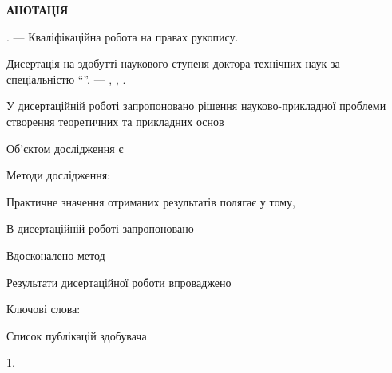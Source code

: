 \clearpage

\begin{center}
\textbf{АНОТАЦІЯ}
\end{center}

\medskip

\textit{\dissauthorUa} \booknameUa.
--- Кваліфікаційна робота на правах рукопису.

Дисертація на здобутті наукового ступеня доктора технічних наук за спеціальністю
\dissSpecId ``\dissSpecUa''. --- \institutionUa, \belongUa, \bookyear.

У дисертаційній роботі запропоновано рішення науково-прикладної проблеми
створення теоретичних та прикладних основ

Об'єктом дослідження є 

Методи дослідження:

Практичне значення отриманих результатів полягає у тому,

В дисертаційній роботі запропоновано

Вдосконалено метод


Результати дисертаційної роботи впроваджено

Ключові слова:

\medskip

\begin{center}
Список публікацій здобувача
\end{center}

1. 



